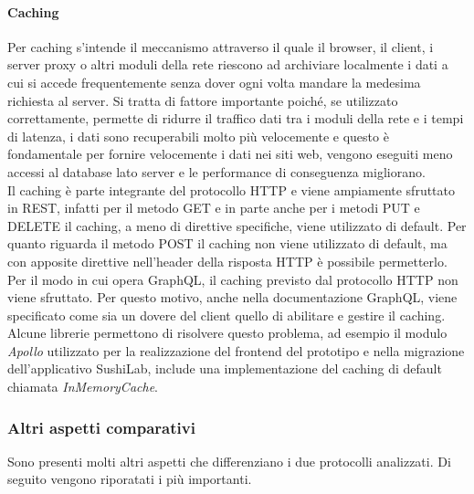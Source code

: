 \paragraph{Caching}
Per caching s'intende il meccanismo attraverso il quale il browser, il client, i server proxy o altri moduli della rete riescono ad archiviare localmente i dati a cui si accede frequentemente senza dover ogni volta mandare la medesima richiesta al server. Si tratta di fattore importante poiché, se utilizzato correttamente, permette di ridurre il traffico dati tra i moduli della rete e i tempi di latenza, i dati sono recuperabili molto più velocemente e questo è fondamentale per fornire velocemente i dati nei siti web, vengono eseguiti meno accessi al database lato server e le performance di conseguenza migliorano.\\
Il caching è parte integrante del protocollo HTTP e viene ampiamente sfruttato in REST, infatti per il metodo GET e in parte anche per i metodi PUT e DELETE il caching, a meno di direttive specifiche, viene utilizzato di default. Per quanto riguarda il metodo POST il caching non viene utilizzato di default, ma con apposite direttive nell'header della risposta HTTP è possibile permetterlo.\\
Per il modo in cui opera GraphQL, il caching previsto dal protocollo HTTP non viene sfruttato. Per questo motivo, anche nella documentazione GraphQL, viene specificato come sia un dovere del client quello di abilitare e gestire il caching. Alcune librerie permettono di risolvere questo problema, ad esempio il modulo \textit{Apollo} utilizzato per la realizzazione del frontend del prototipo e nella migrazione dell'applicativo SushiLab, include una implementazione del caching di default chiamata \textit{InMemoryCache}.
\subsubsection{Altri aspetti comparativi}
Sono presenti molti altri aspetti che differenziano i due protocolli analizzati. Di seguito vengono riporatati i più importanti.
